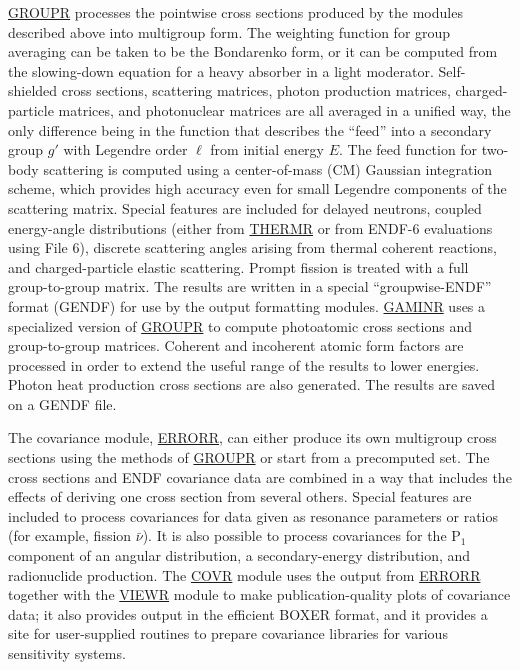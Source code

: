 \hyperlink{sGROUPRhy}{GROUPR}
 processes the pointwise cross sections
 produced by the modules described
above into multigroup form.  The
weighting function  for group averaging
 can be taken to be the Bondarenko
 form, or it can be computed from the
slowing-down equation for a heavy absorber in a light moderator.
  Self-shielded cross sections,
scattering matrices, photon production matrices,
charged-particle matrices, and photonuclear matrices are all
averaged in a unified way, the only difference being in the
function that describes the ``feed'' into a secondary group $g'$
with Legendre order $\ell$ from initial energy $E$.  The feed
function for two-body scattering is computed
using a center-of-mass (CM) Gaussian integration scheme, which
provides high accuracy even for small Legendre components of
the scattering matrix.  Special features are included for delayed
neutrons, coupled energy-angle distributions
 (either from
\hyperlink{sTHERMRhy}{THERMR}
or from ENDF-6 evaluations using File 6),
discrete scattering angles arising from thermal coherent reactions,
and charged-particle elastic scattering.  Prompt fission is treated
with a full group-to-group matrix.
The results are written in a special ``groupwise-ENDF'' format
(GENDF) for use by the output formatting modules.
\hyperlink{sGAMINRhy}{GAMINR} uses
a specialized version of \hyperlink{sGROUPRhy}{GROUPR} to
compute photoatomic cross sections and
group-to-group matrices.  Coherent and incoherent atomic form
factors are processed in order to extend
the useful range of the results to lower energies.  Photon heat
production cross sections are also generated.  The results are
saved on a GENDF file.

The covariance module, \hyperlink{sERRORRhy}{ERRORR},
 can either produce its
own multigroup cross sections using the methods of
\hyperlink{sGROUPRhy}{GROUPR} or start
from a precomputed set.  The cross sections and ENDF covariance
data are combined in a way that includes the effects of deriving
one cross section from several others.  Special features are
included to process covariances for data given as resonance
parameters or ratios (for example, fission $\bar{\nu}$).  It
is also possible to process covariances for the P$_1$
component of an angular distribution, a secondary-energy
distribution, and radionuclide production.  The
\hyperlink{sCOVRhy}{COVR}
module uses the output from \hyperlink{sERRORRhy}{ERRORR}
together with the \hyperlink{sVIEWRhy}{VIEWR}
 module to make publication-quality plots of
covariance data; it also provides output in the efficient BOXER
 format, and it provides a site for user-supplied
routines to prepare covariance libraries
for various sensitivity systems.

